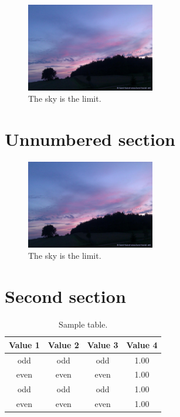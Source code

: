 \documentclass[12pt]{article}
\begin{document}
\lipsum[1]

\begin{figure}[!h]
\centering
\includegraphics[width=0.5\textwidth]{sky.jpg}
\caption{The sky is the limit.}
\end{figure}

\section*{Unnumbered section}
\lipsum[1]

\begin{figure}[!h]
\centering
\includegraphics[width=0.5\textwidth]{sky.jpg}
\caption*{The sky is the limit.}
\end{figure}

\section{Second section}

\lipsum[1]
\begin{table}[!h]
\centering
\caption{Sample table.}
\begin{tabular}{cccc}
\toprule
Value 1 & Value 2 & Value 3 & Value 4\\
\midrule
 odd     & odd   & odd & 1.00 \\
 even    & even  & even& 1.00 \\
 odd     & odd   & odd & 1.00 \\
 even    & even  & even& 1.00 \\
\bottomrule
\end{tabular}
\end{table}

\lipsum[1]

\lipsum[1]
\frameboxend
\end{document}
